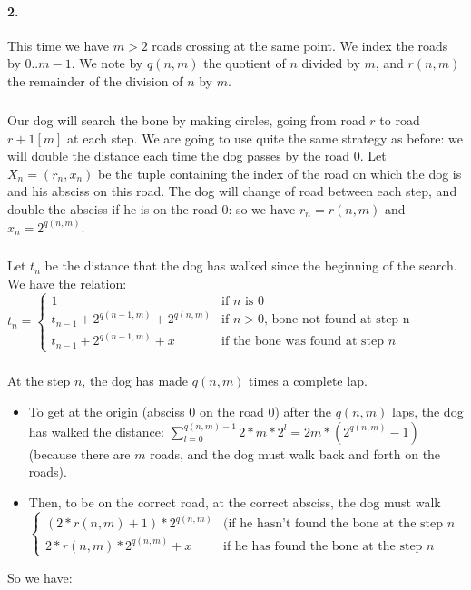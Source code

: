 \paragraph{2.}
This time we have $m>2$ roads crossing at the same point. We index the roads by $0..m-1$. We note by $q(n,m)$ the quotient of $n$ divided by $m$, and $r(n,m)$ the remainder of the division of $n$ by $m$.
\subparagraph{}
Our dog will search the bone by making circles, going from road $r$ to road $r+1[m]$ at each step. We are going to use quite the same strategy as before: we will double the distance each time the dog passes by the road $0$.
Let $X_n=(r_n,x_n)$ be the tuple containing the index of the road on which the dog is and his absciss on this road.
\newline
The dog will change of road between each step, and double the absciss if he is on the road $0$: so we have $r_n=r(n,m)$ and $x_n=2^{q(n,m)}$.
\subparagraph{}
Let $t_n$ be the distance that the dog has walked since the beginning of the search. We have the relation:
$t_n = \begin{cases}
1 & \mbox{if } n \mbox{ is 0}
\\ t_{n-1}+2^{q(n-1,m)}+2^{q(n,m)} & \mbox{if } n>0 \mbox{, bone not found at step n}
\\ t_{n-1}+2^{q(n-1,m)}+x & \mbox{if the bone was found at step } n
\end{cases}$
\newline
\subparagraph{}
At the step $n$, the dog has made $q(n,m)$ times a complete lap.
\begin{itemize}
\item To get at the origin (absciss $0$ on the road $0$) after the $q(n,m)$ laps, the dog has walked the distance:
\newline
$\sum\limits_{l=0}^{q(n,m)-1}{2*m*2^l} = 2m*(2^{q(n,m)}-1)$
\newline
(because there are $m$ roads, and the dog must walk back and forth on the roads).
\newline
\item Then, to be on the correct road, at the correct absciss, the dog must walk
\newline
$\begin{cases}
(2*r(n,m)+1)*2^{q(n,m)} & \mbox{(if he hasn't found the bone at the step } n
\\ 2*r(n,m)*2^{q(n,m)}+x  & \mbox{if he has found the bone at the step } n
\end{cases}$
\end{itemize}
So we have:
\newline
